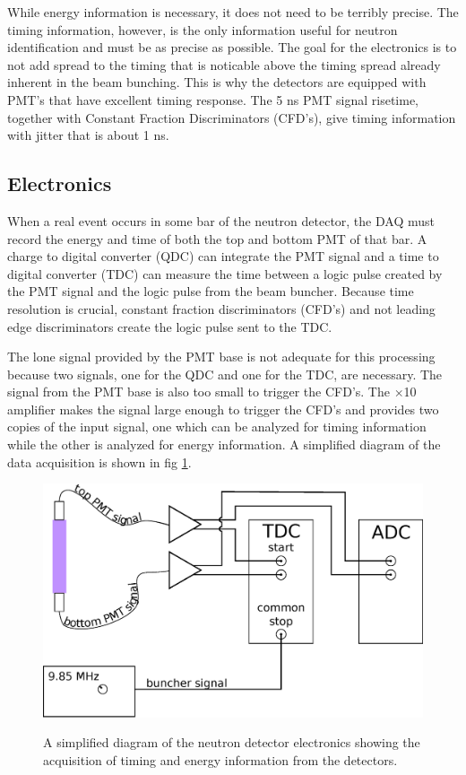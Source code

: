 While energy information is necessary, it does not need to be terribly precise.  The timing information, however, is the only information useful for neutron identification and must be as precise as possible.  The goal for the electronics is to not add spread to the timing that is noticable above the timing spread already inherent in the beam bunching.  This is why the detectors are equipped with PMT's that have excellent timing response.  The 5 ns PMT signal risetime, together with Constant Fraction Discriminators (CFD's), give timing information with jitter that is about 1 ns.


\subsection{Electronics}
When a real event occurs in some bar of the neutron detector, the DAQ must record the energy and time of both the top and bottom PMT of that bar.  A charge to digital converter (QDC) can integrate the PMT signal and a time to digital converter (TDC) can measure the time between a logic pulse created by the PMT signal and the logic pulse from the beam buncher.  Because time resolution is crucial, constant fraction discriminators (CFD's) and not leading edge discriminators create the logic pulse sent to the TDC.  

The lone signal provided by the PMT base is not adequate for this processing because two signals, one for the QDC and one for the TDC, are necessary.  The signal from the PMT base is also too small to trigger the CFD's.  The $\times$10 amplifier makes the signal large enough to trigger the CFD's and provides two copies of the input signal, one which can be analyzed for timing information while the other is analyzed for energy information.  A simplified diagram of the data acquisition is shown in fig \ref{fig:simpleElectronics}.

\begin{figure}[htp]
\centering
\includegraphics[width=1.0\textwidth]{figures/basic_electronics.eps}
\label{fig:simpleElectronics}
\caption{A simplified diagram of the neutron detector electronics showing the acquisition of timing and energy information from the detectors.}
\end{figure}

